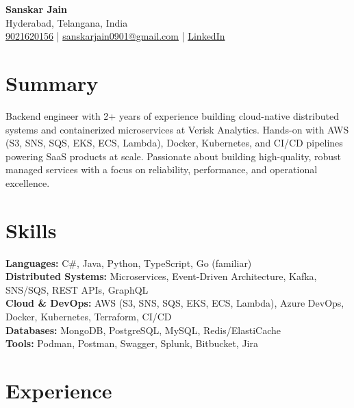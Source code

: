 \documentclass[a4paper,10pt]{article}
\begin{document}
\begin{center}
    {\LARGE \textbf{Sanskar Jain}} \\
    Hyderabad, Telangana, India \\
    \href{tel:9021620156}{9021620156} \;|\;
    \href{mailto:sanskarjain0901@gmail.com}{sanskarjain0901@gmail.com} \;|\;
    \href{https://www.linkedin.com/in/sanskar-jain0901/}{LinkedIn}
\end{center}

\vspace{3pt}

\section*{Summary}
Backend engineer with 2+ years of experience building cloud-native distributed systems and containerized microservices at Verisk Analytics.
Hands-on with AWS (S3, SNS, SQS, EKS, ECS, Lambda), Docker, Kubernetes, and CI/CD pipelines powering SaaS products at scale.
Passionate about building high-quality, robust managed services with a focus on reliability, performance, and operational excellence.

\section*{Skills}
\textbf{Languages:} C\#, Java, Python, TypeScript, Go (familiar) \\
\textbf{Distributed Systems:} Microservices, Event-Driven Architecture, Kafka, SNS/SQS, REST APIs, GraphQL \\
\textbf{Cloud \& DevOps:} AWS (S3, SNS, SQS, EKS, ECS, Lambda), Azure DevOps, Docker, Kubernetes, Terraform, CI/CD \\
\textbf{Databases:} MongoDB, PostgreSQL, MySQL, Redis/ElastiCache \\
\textbf{Tools:} Podman, Postman, Swagger, Splunk, Bitbucket, Jira

\section*{Experience}
\end{document}
